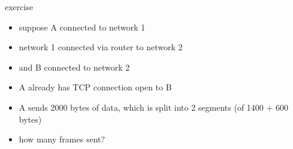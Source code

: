 \begin{frame}{exercise}
    \begin{itemize}
    \item suppose A connected to network 1
    \item network 1 connected via router to network 2
    \item and B connected to network 2
    \vspace{.5cm}
    \item A already has TCP connection open to B
    \item A sends 2000 bytes of data, which is split into 2 segments (of 1400 + 600 bytes)
    \item how many frames sent?
    \end{itemize}
\end{frame}
